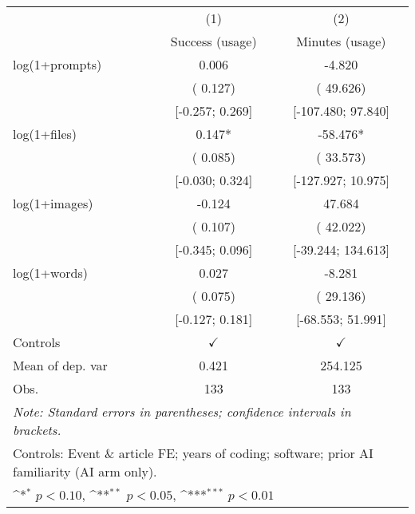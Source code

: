 \def\sym#1{\ifmmode^{#1}\else\(^{#1}\)\fi}
\begin{tabular}{l*{2}{c}}
\hline\hline
 & (1) & (2)
\\
 & Success (usage) & Minutes (usage)
 \\
\hline
log(1+prompts) &  0.006 & -4.820
\\
 & ( 0.127) & ( 49.626)
\\
 & [-0.257;  0.269] & [-107.480;  97.840]
\\
log(1+files) &  0.147* & -58.476*
\\
 & ( 0.085) & ( 33.573)
\\
 & [-0.030;  0.324] & [-127.927;  10.975]
\\
log(1+images) & -0.124 &  47.684
\\
 & ( 0.107) & ( 42.022)
\\
 & [-0.345;  0.096] & [-39.244;  134.613]
\\
log(1+words) &  0.027 & -8.281
\\
 & ( 0.075) & ( 29.136)
\\
 & [-0.127;  0.181] & [-68.553;  51.991]
\\
\hline
Controls & $\checkmark$ & $\checkmark$
\\
Mean of dep. var &  0.421 &  254.125
\\
Obs. & 133 & 133
\\
\hline
\hline\hline
\multicolumn{3}{l}{\it{Note:} Standard errors in parentheses; confidence intervals in brackets.}\\
\multicolumn{3}{l}{Controls: Event \& article FE; years of coding; software; prior AI familiarity (AI arm only).}\\
\multicolumn{3}{l}{\sym{*} $p<0.10$, \sym{**} $p<0.05$,  \sym{***} $p<0.01$}\\
\end{tabular}
